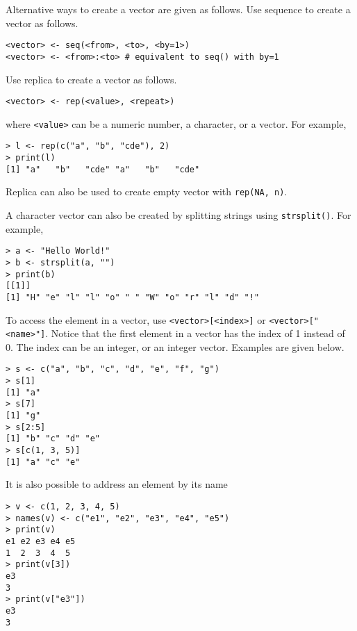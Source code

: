 Alternative ways to create a vector are given as follows. Use sequence to create a vector as follows.
\begin{lstlisting}
<vector> <- seq(<from>, <to>, <by=1>)
<vector> <- <from>:<to> # equivalent to seq() with by=1
\end{lstlisting}

Use replica to create a vector as follows.
\begin{lstlisting}
<vector> <- rep(<value>, <repeat>)
\end{lstlisting}
where \verb|<value>| can be a numeric number, a character, or a vector. For example,
\begin{lstlisting}
> l <- rep(c("a", "b", "cde"), 2)
> print(l)
[1] "a"   "b"   "cde" "a"   "b"   "cde"
\end{lstlisting}
Replica can also be used to create empty vector with \verb|rep(NA, n)|.

A character vector can also be created by splitting strings using \verb|strsplit()|. For example,
\begin{lstlisting}
> a <- "Hello World!"
> b <- strsplit(a, "")
> print(b)
[[1]]
[1] "H" "e" "l" "l" "o" " " "W" "o" "r" "l" "d" "!"
\end{lstlisting}

To access the element in a vector, use \verb|<vector>[<index>]| or \verb|<vector>["<name>"]|. Notice that the first element in a vector has the index of 1 instead of 0. The index can be an integer, or an integer vector. Examples are given below.
\begin{lstlisting}
> s <- c("a", "b", "c", "d", "e", "f", "g")
> s[1]
[1] "a"
> s[7]
[1] "g"
> s[2:5]
[1] "b" "c" "d" "e"
> s[c(1, 3, 5)]
[1] "a" "c" "e"
\end{lstlisting}
It is also possible to address an element by its name
\begin{lstlisting}
> v <- c(1, 2, 3, 4, 5)
> names(v) <- c("e1", "e2", "e3", "e4", "e5") 	
> print(v)
e1 e2 e3 e4 e5
1  2  3  4  5
> print(v[3])
e3
3
> print(v["e3"])
e3
3
\end{lstlisting}

